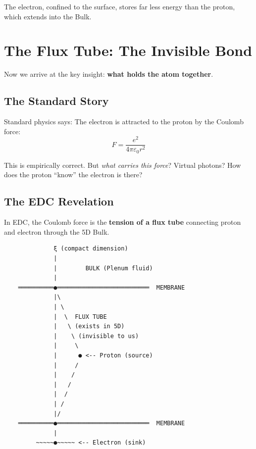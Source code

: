 The electron, confined to the surface, stores far less energy than the proton, which extends into the Bulk.


\section{The Flux Tube: The Invisible Bond}
\label{sec:flux_tube}

Now we arrive at the key insight: \textbf{what holds the atom together}.

\subsection{The Standard Story}
\label{subsec:standard_bond}

Standard physics says: The electron is attracted to the proton by the Coulomb force:
\begin{equation}
F = \frac{e^2}{4\pi\varepsilon_0 r^2}
\end{equation}

This is empirically correct. But \textit{what carries this force}? Virtual photons? How does the proton ``know'' the electron is there?

\subsection{The EDC Revelation}
\label{subsec:edc_bond}

In EDC, the Coulomb force is the \textbf{tension of a flux tube} connecting proton and electron through the 5D Bulk.

\begin{tcolorbox}[colback=red!5,colframe=red!70!black,title=\textbf{The Flux Tube: What We Cannot See}]
\begin{verbatim}
              ξ (compact dimension)
              |
              |        BULK (Plenum fluid)
              |
    ══════════●══════════════════════════  MEMBRANE
              |\
              | \
              |  \  FLUX TUBE
              |   \ (exists in 5D)
              |    \ (invisible to us)
              |     \
              |      ● <-- Proton (source)
              |     /
              |    /
              |   /
              |  /
              | /
              |/
    ══════════●══════════════════════════  MEMBRANE
              |
         ~~~~~●~~~~~ <-- Electron (sink)
\end{verbatim}
\end{tcolorbox}

